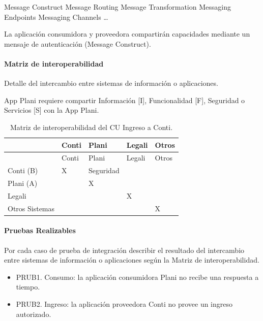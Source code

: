 \documentclass[
  paper=a4,
  ,captions=tableheading
]{scrartcl}
\providecommand{\tightlist}{%
  \setlength{\itemsep}{0pt}\setlength{\parskip}{0pt}}
\begin{document}
Message Construct \textbar{} Message Routing \textbar{} Message
Transformation \textbar{} Messaging Endpoints \textbar{} Messaging
Channels \textbar{} \ldots{}

La aplicación consumidora y proveedora compartirán capacidades mediante
un mensaje de autenticación (Message Construct).

\paragraph{Matriz de
interoperabilidad}\label{sec:matriz-de-interoperabilidad-4}

Detalle del intercambio entre sistemas de información o aplicaciones.

App Plani requiere compartir Información {[}I{]}, Funcionalidad {[}F{]},
Seguridad o Servicios {[}S{]} con la App Plani.

\begin{longtable}[]{@{}lllll@{}}
\caption{Matriz de interoperabilidad del CU Ingreso a
Conti.}\tabularnewline
\toprule\noalign{}
& Conti & Plani & Legali & Otros \\
\midrule\noalign{}
\endfirsthead
\toprule\noalign{}
& Conti & Plani & Legali & Otros \\
\midrule\noalign{}
\endhead
\bottomrule\noalign{}
\endlastfoot
Conti (B) & X & Seguridad & & \\
Plani (A) & & X & & \\
Legali & & & X & \\
Otros Sistemas & & & & X \\
\end{longtable}

\paragraph{Pruebas Realizables}\label{sec:pruebas-realizables-4}

Por cada caso de prueba de integración describir el resultado del
intercambio entre sistemas de información o aplicaciones según la Matriz
de interoperabilidad.

\begin{itemize}
\tightlist
\item
  PRUB1. Consumo: la aplicación consumidora Plani no recibe una
  respuesta a tiempo.
\item
  PRUB2. Ingreso: la aplicación proveedora Conti no provee un ingreso
  autorizado.
\end{itemize}
\end{document}
